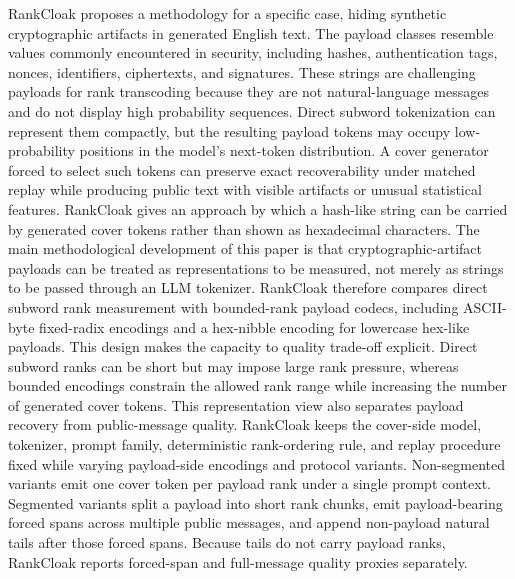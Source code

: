 \documentclass[fleqn,10pt]{wlscirep}
\begin{document}
RankCloak proposes a methodology for a specific case, hiding synthetic cryptographic artifacts in generated English text. The payload classes resemble values commonly encountered in security, including hashes, authentication tags, nonces, identifiers, ciphertexts, and signatures\cite{NIST2015SecureHashStandard,Josefsson2006RFC4648,DavisPeabodyLeach2024RFC9562}. These strings are challenging payloads for rank transcoding because they are not natural-language messages and do not display high probability sequences. Direct subword tokenization can represent them compactly, but the resulting payload tokens may occupy low-probability positions in the model's next-token distribution\cite{Sennrich2016SubwordUnits,KudoRichardson2018SentencePiece}. A cover generator forced to select such tokens can preserve exact recoverability under matched replay while producing public text with visible artifacts or unusual statistical features. RankCloak gives an approach by which a hash-like string can be carried by generated cover tokens rather than shown as hexadecimal characters. The main methodological development of this paper is that cryptographic-artifact payloads can be treated as representations to be measured, not merely as strings to be passed through an LLM tokenizer. RankCloak therefore compares direct subword rank measurement with bounded-rank payload codecs, including ASCII-byte fixed-radix encodings and a hex-nibble encoding for lowercase hex-like payloads. This design makes the capacity to quality trade-off explicit. Direct subword ranks can be short but may impose large rank pressure, whereas bounded encodings constrain the allowed rank range while increasing the number of generated cover tokens. This representation view also separates payload recovery from public-message quality. RankCloak keeps the cover-side model, tokenizer, prompt family, deterministic rank-ordering rule, and replay procedure fixed while varying payload-side encodings and protocol variants. Non-segmented variants emit one cover token per payload rank under a single prompt context. Segmented variants split a payload into short rank chunks, emit payload-bearing forced spans across multiple public messages, and append non-payload natural tails after those forced spans. Because tails do not carry payload ranks, RankCloak reports forced-span and full-message quality proxies separately.
\end{document}
